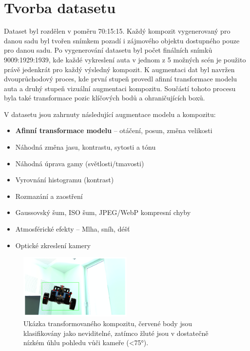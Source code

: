 \section{Tvorba datasetu}
\label{sec:Chapter41}

Dataset byl rozdělen v poměru 70:15:15. Každý kompozit vygenerovaný pro danou sadu byl tvořen snímkem pozadí i zájmového objektu dostupného pouze pro danou sadu. Po vygenerování datasetu byl počet finálních snímků 9009:1929:1939, kde každé vykreslení auta v jednom z 5 možných scén je použito právě jedenkrát pro každý výsledný kompozit. K augmentaci dat byl navržen dvouprůchodový proces, kde první stupeň provedl afinní transformace modelu auta a druhý stupeň vizuální augmentaci kompozitu. Součástí tohoto procesu byla také transformace pozic klíčových bodů a ohraničujících boxů.

V datasetu jsou zahrnuty následující augmentace modelu a kompozitu:
\begin{itemize}
\item \textbf{Afinní transformace modelu} -- otáčení, posun, změna velikosti
\item Náhodná změna jasu, kontrastu, sytosti a tónu
\item Náhodná úprava gamy (světlosti/tmavosti)
\item Vyrovnání histogramu (kontrast)
\item Rozmazání a zaostření
\item Gaussovský šum, ISO šum, JPEG/WebP kompresní chyby
\item Atmosférické efekty -- Mlha, sníh, déšť
\item Optické zkreslení kamery
\end{itemize}


\begin{figure}[ht]
\centering
\includegraphics[width=0.5\textwidth,keepaspectratio]{Figures/dataset_ex.png}
\caption[Ukázka transformovaného kompozitu]{Ukázka transformovaného kompozitu, červené body jsou klasifikovány jako neviditelné, zatímco žluté jsou v dostatečně nízkém úhlu pohledu vůči kameře (<75°).}
\label{fig:datasetimg}
\end{figure}
